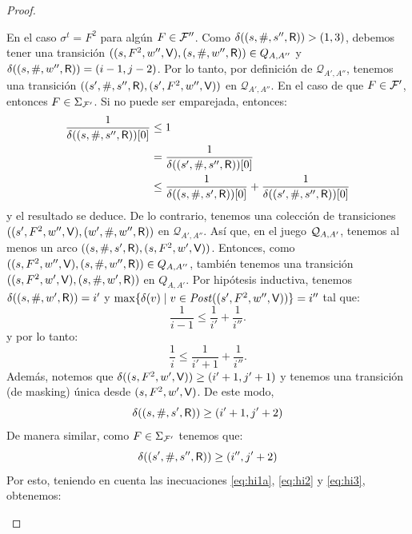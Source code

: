\begin{proof}
\begin{description}
  En el caso $\sigma^t = F^2$ para algún $F \in \Faults''$. Como $\delta((s, \#, s'', \Refuter)) > (1,3)$,
debemos tener una transición $((s, F^2, w'', \Verifier), (s, \#, w'', \Refuter)) \in Q_{A,A''}$ y $\delta((s, \#, w'', \Refuter)) = (i-1,j-2)$. 
Por lo tanto, por definición de $\mathcal{Q}_{A',A''}$, tenemos una transición 
$((s', \#, s'', \Refuter), (s', F^2, w'', \Verifier))$ en $\mathcal{Q}_{A',A''}$. 
En el caso de que $F \in \Faults'$, entonces $F \in \Sigma_{\Faults'}$. 
Si no puede ser emparejada, entonces:
\begin{align*}
\frac{1}{\pr{0}{\delta((s,\#, s'', \Refuter))}}  & \leq 1	\\
							     &= \frac{1}{\pr{0}{\delta((s', \#, s'', \Refuter))}}  \\
							     &\leq  \frac{1}{\pr{0}{\delta((s, \#, s', \Refuter))}} +  \frac{1}{\pr{0}{\delta((s', \#, s'', \Refuter))}}   
\end{align*}
y el resultado se deduce. De lo contrario, tenemos una colección de transiciones  $((s', F^2, w'', \Verifier), (w', \#, w'', \Refuter))$ en $\mathcal{Q}_{A',A''}$. 
Así que, en el juego $\QMStrGame$, tenemos al menos un arco $((s, \#, s', \Refuter), (s, F^2, w', \Verifier))$. 
Entonces, como $((s, F^2, w'', \Verifier), (s, \#, w'', \Refuter)) \in Q_{A,A''}$, también tenemos una transición $((s, F^2, w', \Verifier), (s, \#, w', \Refuter))$ en $Q_{A,A'}$. 
Por hipótesis inductiva, tenemos $\delta((s, \#, w', \Refuter))= i'$ y $\max \{ \delta(v) \mid v \in \post((s', F^2, w'', \Verifier)) \}=i''$ tal que:
\begin{equation}\label{eq:hi1}
\frac{1}{i-1} \leq \frac{1}{i'} + \frac{1}{i''}.
\end{equation} 
y por lo tanto:
\begin{equation}\label{eq:hi1a}
\frac{1}{i} \leq \frac{1}{i'+1} + \frac{1}{i''}.
\end{equation}
Además, notemos que $\delta((s, F^2, w', \Verifier)) \geq (i'+1,j'+1)$ y tenemos una transición (de masking) única desde $(s, F^2, w', \Verifier)$. 
De este modo, 
\begin{equation}\label{eq:hi2}
	\delta((s, \#, s', \Refuter)) \geq (i'+1,j'+2)
\end{equation}
De manera similar, como $F \in \Sigma_{\Faults'}$ tenemos que:
\begin{equation}\label{eq:hi3}
	\delta((s', \#, s'', \Refuter)) \geq (i'',j'+2)
\end{equation}
Por esto, teniendo en cuenta las inecuaciones \ref{eq:hi1a}, \ref{eq:hi2} y \ref{eq:hi3}, obtenemos:

\end{description}
\end{proof}
